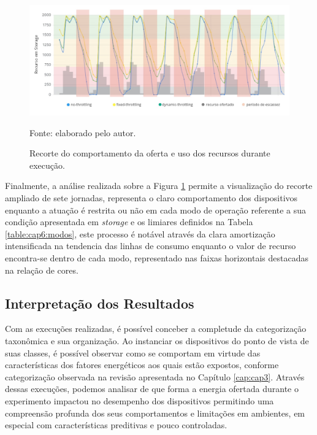 \begin{figure}[H]
	\centering	
	\caption{Recorte do comportamento da oferta e uso dos recursos durante execução.} 
	\label{fig:cap6recortecomportamentostorage}
	\noindent\includegraphics[width=1\linewidth]{Imagens/cap6/cap6recortecomportamentostorage.jpg} 
	
	Fonte: elaborado pelo autor.
\end{figure}

Finalmente, a análise realizada sobre a Figura \ref{fig:cap6recortecomportamentostorage} permite a visualização do recorte ampliado de sete jornadas, representa o claro comportamento dos dispositivos enquanto a atuação é restrita ou não em cada modo de operação referente a sua condição apresentada em \textit{storage} e os limiares definidos na Tabela \ref{table:cap6:modos}, este processo é notável através da clara amortização intensificada na tendencia das linhas de consumo enquanto o valor de recurso encontra-se dentro de cada modo, representado nas faixas horizontais destacadas na relação de cores.


\subsection{Interpretação dos Resultados}

Com as execuções realizadas, é possível conceber a completude da categorização taxonômica e sua organização. Ao instanciar os dispositivos do ponto de vista de suas classes,  é possível observar como se comportam em virtude das características dos fatores energéticos aos quais estão expostos, conforme categorização observada na revisão apresentada no Capítulo \ref{cap:cap3}. Através dessas execuções, podemos analisar de que forma a energia ofertada durante o experimento impactou no desempenho dos dispositivos permitindo uma compreensão profunda dos seus comportamentos e limitações em ambientes, em especial com características preditivas e pouco controladas.

